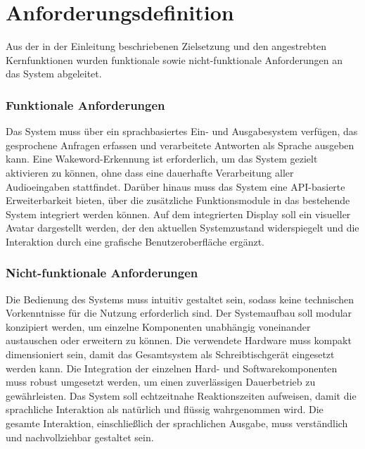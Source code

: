 \section{Anforderungsdefinition}

Aus der in der Einleitung beschriebenen Zielsetzung und den angestrebten Kernfunktionen wurden funktionale sowie nicht-funktionale Anforderungen an das System abgeleitet.

\subsubsection{Funktionale Anforderungen}

Das System muss über ein sprachbasiertes Ein- und Ausgabesystem verfügen, das gesprochene Anfragen erfassen und verarbeitete Antworten als Sprache ausgeben kann.
Eine Wakeword-Erkennung ist erforderlich, um das System gezielt aktivieren zu können, ohne dass eine dauerhafte Verarbeitung aller Audioeingaben stattfindet.
Darüber hinaus muss das System eine API-basierte Erweiterbarkeit bieten, über die zusätzliche Funktionsmodule in das bestehende System integriert werden können.
Auf dem integrierten Display soll ein visueller Avatar dargestellt werden, der den aktuellen Systemzustand widerspiegelt und die Interaktion durch eine grafische Benutzeroberfläche ergänzt.

\subsubsection{Nicht-funktionale Anforderungen}

Die Bedienung des Systems muss intuitiv gestaltet sein, sodass keine technischen Vorkenntnisse für die Nutzung erforderlich sind.
Der Systemaufbau soll modular konzipiert werden, um einzelne Komponenten unabhängig voneinander austauschen oder erweitern zu können.
Die verwendete Hardware muss kompakt dimensioniert sein, damit das Gesamtsystem als Schreibtischgerät eingesetzt werden kann.
Die Integration der einzelnen Hard- und Softwarekomponenten muss robust umgesetzt werden, um einen zuverlässigen Dauerbetrieb zu gewährleisten.
Das System soll echtzeitnahe Reaktionszeiten aufweisen, damit die sprachliche Interaktion als natürlich und flüssig wahrgenommen wird.
Die gesamte Interaktion, einschließlich der sprachlichen Ausgabe, muss verständlich und nachvollziehbar gestaltet sein.
